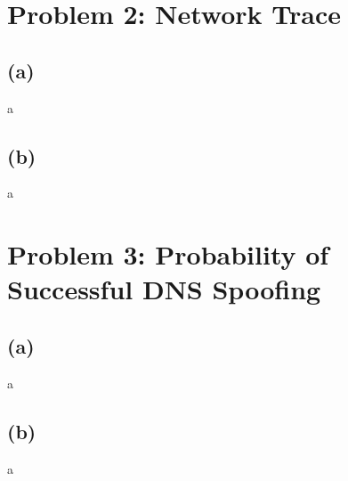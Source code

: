 \documentclass[12pt,pdftex,a4paper]{article}
\begin{document}
\newpage
\section*{Problem 2: Network Trace}
\subsection*{(a)}
a

\subsection*{(b)}
a

\section*{Problem 3: Probability of Successful DNS Spoofing}
\subsection*{(a)}
a

\subsection*{(b)}
a
\end{document}
